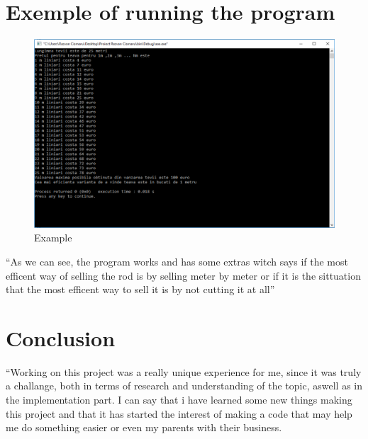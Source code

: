 \documentclass{article}
\begin{document}
\section{Exemple of running the program}
\begin{figure}[h!]
\centering
\includegraphics[scale=0.6]{exemplu.PNG}
\caption{Example}
\label{fig:universe}
\end{figure}
``As we can see, the program works and has some extras witch says if the most efficent way of selling the rod is by selling meter by meter or if it is the sittuation that the most efficent way to sell it is by not cutting it at all'' \


\section{Conclusion}
``Working  on  this  project  was  a  really  unique  experience  for  me,  since  it  was truly a challange, both in terms of research and understanding of the topic, aswell as in the implementation part.  I can say that i have learned some new things making this project and that it has started the interest of making a code that may help me do something easier or even my parents with their business.\\
\end{document}
